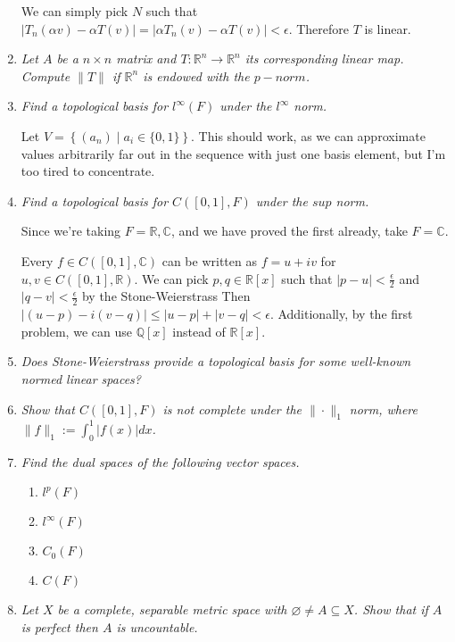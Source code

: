 \documentclass[11pt]{article}
\begin{document}
\begin{enumerate}
We can simply pick $N$ such that $|T_n(\alpha v) - \alpha T(v)| = |\alpha T_n(v) - \alpha T(v)| < \epsilon$.  Therefore $T$ is linear.

\item \emph{Let $A$ be a $n \times n$ matrix and $T: \mathbb{R}^n \rightarrow \mathbb{R}^n$ its corresponding linear map.  Compute $\|T\|$ if $\mathbb{R}^n$ is endowed with the $p-norm$.}

\item \emph{Find a topological basis for $l^\infty(F)$ under the $l^\infty$ norm.}

Let $V = \left\{(a_n) \mid a_i \in \{0,1\}\right\}$.  This should work, as we can approximate values arbitrarily far out in the sequence with just one basis element, but I'm too tired to concentrate.

\item \emph{Find a topological basis for $C([0,1],F)$ under the $sup$ norm.}

Since we're taking $F = \mathbb{R}, \mathbb{C}$, and we have proved the first already, take $F = \mathbb{C}$.

Every $f \in C([0,1],\mathbb{C})$ can be written as $f = u + iv$ for $u,v \in C([0,1],\mathbb{R})$.  We can pick $p,q \in \mathbb{R}[x]$ such that $|p - u| < \frac{\epsilon}{2}$ and $|q - v| < \frac{\epsilon}{2}$ by the Stone-Weierstrass  Then $|(u-p) - i(v-q)| \leq |u-p| + |v-q| < \epsilon$.  Additionally, by the first problem, we can use $\mathbb{Q}[x]$ instead of $\mathbb{R}[x]$.

\item \emph{Does Stone-Weierstrass provide a topological basis for some well-known normed linear spaces?}

\item \emph{Show that $C([0,1],F)$ is not complete under the $\|\cdot\|_1$ norm, where $\|f\|_1 := \int_0^1|f(x)|dx$.}

\item \emph{Find the dual spaces of the following vector spaces.}
\begin{enumerate}
\item \emph{$l^p(F)$}
\item \emph{$l^\infty(F)$}
\item \emph{$C_0(F)$}
\item \emph{$C(F)$}
\end{enumerate}

\item \emph{Let $X$ be a complete, separable metric space with $\varnothing \neq A \subseteq X$.  Show that if $A$ is perfect then $A$ is uncountable.}


\end{enumerate}
\end{document}
